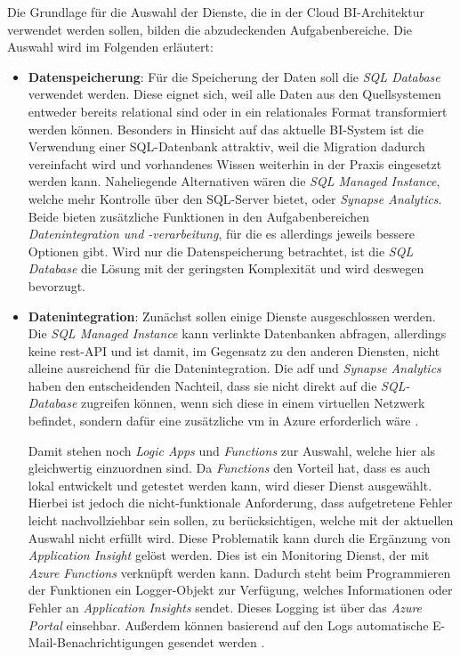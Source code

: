 Die Grundlage für die Auswahl der Dienste, die in der Cloud BI-Architektur verwendet werden sollen, bilden die abzudeckenden Aufgabenbereiche. Die Auswahl wird im Folgenden erläutert:
\begin{itemize}
\item \textbf{Datenspeicherung}: Für die Speicherung der Daten soll die \textit{SQL Database} verwendet werden. Diese eignet sich, weil alle Daten aus den Quellsystemen entweder bereits relational sind oder in ein relationales Format transformiert werden können. Besonders in Hinsicht auf das aktuelle BI-System ist die Verwendung einer SQL-Datenbank attraktiv, weil die Migration dadurch vereinfacht wird und vorhandenes Wissen weiterhin in der Praxis eingesetzt werden kann. Naheliegende Alternativen wären die \textit{SQL Managed Instance}, welche mehr Kontrolle über den SQL-Server bietet, oder \textit{Synapse Analytics}. Beide bieten zusätzliche Funktionen in den Aufgabenbereichen \textit{Datenintegration und -verarbeitung}, für die es allerdings jeweils bessere Optionen gibt. Wird nur die Datenspeicherung betrachtet, ist die \textit{SQL Database} die Lösung mit der geringsten Komplexität und wird deswegen bevorzugt.

\item \textbf{Datenintegration}: Zunächst sollen einige Dienste ausgeschlossen werden. Die \textit{SQL Managed Instance} kann verlinkte Datenbanken abfragen, allerdings keine \ac{rest}-API und ist damit, im Gegensatz zu den anderen Diensten, nicht alleine ausreichend für die Datenintegration. Die \ac{adf} und \textit{Synapse Analytics} haben den entscheidenden Nachteil, dass sie nicht direkt auf die \textit{SQL-Database} zugreifen können, wenn sich diese in einem virtuellen Netzwerk befindet, sondern dafür eine zusätzliche \ac{vm} in Azure erforderlich wäre \cite{msdoc_22_adf_integrationRuntime}.

Damit stehen noch \textit{Logic Apps} und \textit{Functions} zur Auswahl, welche hier als gleichwertig einzuordnen sind. Da \textit{Functions} den Vorteil hat, dass es auch lokal entwickelt und getestet werden kann, wird dieser Dienst ausgewählt. Hierbei ist jedoch die nicht-funktionale Anforderung, dass aufgetretene Fehler leicht nachvollziehbar sein sollen, zu berücksichtigen, welche mit der aktuellen Auswahl nicht erfüllt wird. Diese Problematik kann durch die Ergänzung von \textit{Application Insight} gelöst werden. Dies ist ein Monitoring Dienst, der mit \textit{Azure Functions} verknüpft werden kann. Dadurch steht beim Programmieren der Funktionen ein Logger-Objekt zur Verfügung, welches Informationen oder Fehler an \textit{Application Insights} sendet. Dieses Logging ist über das \textit{Azure Portal} einsehbar. Außerdem können basierend auf den Logs automatische E-Mail-Benachrichtigungen gesendet werden \cite[vgl.][]{satapathi_hands-azure_2021}.


\end{itemize}
